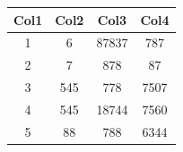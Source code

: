 \documentclass{article}
\begin{document}
	\begin{center}
		\begin{tabular}{|| c  c  c c ||}
			\hline
			Col1 & Col2 & Col3 & Col4 \\
			\hline \hline
			1 & 6 & 87837 & 787 \\
			\hline
			2 & 7 & 878 & 87 \\
			\hline
			3 & 545 & 778 & 7507 \\
			\hline
			4 & 545 & 18744 & 7560 \\
			\hline
			5 & 88 & 788 & 6344 \\
			\hline
		\end{tabular}
	\end{center}
\end{document}

